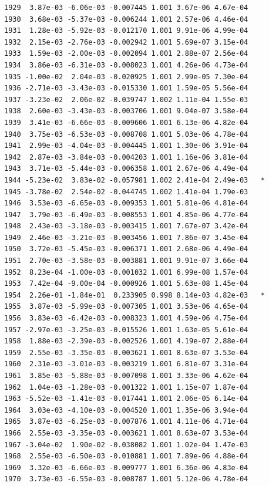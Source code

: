 \documentclass[
  letterpaper,
  DIV=11,
  numbers=noendperiod]{scrartcl}
\begin{document}
\begin{verbatim}
1929  3.87e-03 -6.06e-03 -0.007445 1.001 3.67e-06 4.67e-04    
1930  3.68e-03 -5.37e-03 -0.006244 1.001 2.57e-06 4.46e-04    
1931  1.28e-03 -5.92e-03 -0.012170 1.001 9.91e-06 4.99e-04    
1932  2.15e-03 -2.76e-03 -0.002942 1.001 5.69e-07 3.15e-04    
1933  1.59e-03 -2.00e-03 -0.002094 1.001 2.88e-07 2.56e-04    
1934  3.86e-03 -6.31e-03 -0.008023 1.001 4.26e-06 4.73e-04    
1935 -1.00e-02  2.04e-03 -0.020925 1.001 2.99e-05 7.30e-04    
1936 -2.71e-03 -3.43e-03 -0.015330 1.001 1.59e-05 5.56e-04    
1937 -3.23e-02  2.06e-02 -0.039747 1.002 1.11e-04 1.55e-03    
1938  2.60e-03 -3.43e-03 -0.003706 1.001 9.04e-07 3.58e-04    
1939  3.41e-03 -6.66e-03 -0.009606 1.001 6.13e-06 4.82e-04    
1940  3.75e-03 -6.53e-03 -0.008708 1.001 5.03e-06 4.78e-04    
1941  2.99e-03 -4.04e-03 -0.004445 1.001 1.30e-06 3.91e-04    
1942  2.87e-03 -3.84e-03 -0.004203 1.001 1.16e-06 3.81e-04    
1943  3.71e-03 -5.44e-03 -0.006358 1.001 2.67e-06 4.49e-04    
1944 -5.23e-02  3.83e-02 -0.057981 1.002 2.41e-04 2.49e-03   *
1945 -3.78e-02  2.54e-02 -0.044745 1.002 1.41e-04 1.79e-03    
1946  3.53e-03 -6.65e-03 -0.009353 1.001 5.81e-06 4.81e-04    
1947  3.79e-03 -6.49e-03 -0.008553 1.001 4.85e-06 4.77e-04    
1948  2.43e-03 -3.18e-03 -0.003415 1.001 7.67e-07 3.42e-04    
1949  2.46e-03 -3.21e-03 -0.003456 1.001 7.86e-07 3.45e-04    
1950  3.72e-03 -5.45e-03 -0.006371 1.001 2.68e-06 4.49e-04    
1951  2.70e-03 -3.58e-03 -0.003881 1.001 9.91e-07 3.66e-04    
1952  8.23e-04 -1.00e-03 -0.001032 1.001 6.99e-08 1.57e-04    
1953  7.42e-04 -9.00e-04 -0.000926 1.001 5.63e-08 1.45e-04    
1954  2.26e-01 -1.84e-01  0.233905 0.998 8.14e-03 4.82e-03   *
1955  3.87e-03 -5.99e-03 -0.007305 1.001 3.53e-06 4.65e-04    
1956  3.83e-03 -6.42e-03 -0.008323 1.001 4.59e-06 4.75e-04    
1957 -2.97e-03 -3.25e-03 -0.015526 1.001 1.63e-05 5.61e-04    
1958  1.88e-03 -2.39e-03 -0.002526 1.001 4.19e-07 2.88e-04    
1959  2.55e-03 -3.35e-03 -0.003621 1.001 8.63e-07 3.53e-04    
1960  2.31e-03 -3.01e-03 -0.003219 1.001 6.81e-07 3.31e-04    
1961  3.85e-03 -5.88e-03 -0.007098 1.001 3.33e-06 4.62e-04    
1962  1.04e-03 -1.28e-03 -0.001322 1.001 1.15e-07 1.87e-04    
1963 -5.52e-03 -1.41e-03 -0.017441 1.001 2.06e-05 6.14e-04    
1964  3.03e-03 -4.10e-03 -0.004520 1.001 1.35e-06 3.94e-04    
1965  3.87e-03 -6.25e-03 -0.007876 1.001 4.11e-06 4.71e-04    
1966  2.55e-03 -3.35e-03 -0.003621 1.001 8.63e-07 3.53e-04    
1967 -3.04e-02  1.90e-02 -0.038082 1.001 1.02e-04 1.47e-03    
1968  2.55e-03 -6.50e-03 -0.010881 1.001 7.89e-06 4.88e-04    
1969  3.32e-03 -6.66e-03 -0.009777 1.001 6.36e-06 4.83e-04    
1970  3.73e-03 -6.55e-03 -0.008787 1.001 5.12e-06 4.78e-04    

\end{verbatim}
\end{document}
